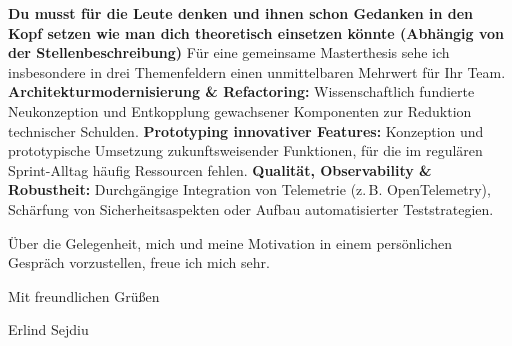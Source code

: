 \documentclass[a4paper,11pt]{article}
\begin{document}
\textbf{Du musst für die Leute denken und ihnen schon Gedanken in den Kopf setzen wie man dich theoretisch einsetzen könnte (Abhängig von der Stellenbeschreibung)}
Für eine gemeinsame Masterthesis sehe ich insbesondere in drei Themenfeldern einen unmittelbaren Mehrwert für Ihr Team.
\textbf{Architekturmodernisierung \& Refactoring:} Wissenschaftlich fundierte Neukonzeption und Entkopplung gewachsener Komponenten zur Reduktion technischer Schulden.
\textbf{Prototyping innovativer Features:} Konzeption und prototypische Umsetzung zukunftsweisender Funktionen, für die im regulären Sprint-Alltag häufig Ressourcen fehlen.
\textbf{Qualität, Observability \& Robustheit:} Durchgängige Integration von Telemetrie (z.\,B. OpenTelemetry), Schärfung von Sicherheitsaspekten oder Aufbau automatisierter Teststrategien.

Über die Gelegenheit, mich und meine Motivation in einem persönlichen Gespräch vorzustellen, freue ich mich sehr.

\vspace{0.6em}

Mit freundlichen Grüßen

\vspace{1.5em}

Erlind Sejdiu
\end{document}
